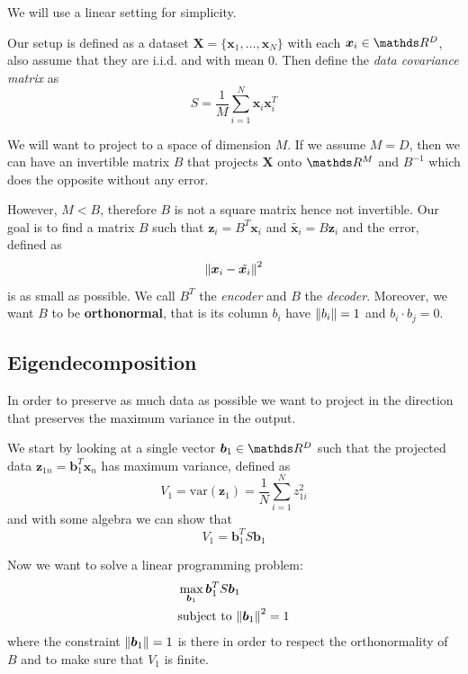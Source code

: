 \documentclass[12pt]{extarticle}
\renewcommand{\vec}[1]{\bm{#1}}
\begin{document}
We will use a linear setting for simplicity.

Our setup is defined as a dataset $\vec X = \{ \vec x_1, \dots, \vec x_N\}$
with each $\vec x_i \in \R^D$, also assume that they are i.i.d. and with mean $0$.
Then define the \emph{data covariance matrix} as
\begin{equation}
	S = \frac{1}{M} \sum_{i = 1}^N \vec x_i \vec x_i^T
\end{equation}

We will want to project to a space of dimension $M$. If we assume $M = D$, then we can have
an invertible matrix $B$ that projects $\bm X$ onto $\R^M$ and $B^{-1}$ which does the opposite
without any error.

However, $M < B$, therefore $B$ is not a square matrix hence not invertible.
Our goal is to find a matrix $B$ such that $\vec z_i = B^T \vec x_i$ and
$\tilde{\vec x_i} = B \vec z_i$ and the error, defined as
\begin{equation}
	\norm{\vec x_i - \tilde{\vec x_i}}^2
\end{equation}
is as small as possible.
We call $B^T$ the \emph{encoder} and $B$ the \emph{decoder}.
Moreover, we want $B$ to be \textbf{orthonormal},
that is its column $b_i$ have $\norm{b_i} = 1$ and $b_i \cdot b_j = 0$.

\subsection{Eigendecomposition}

In order to preserve as much data as possible we want to project in the direction that preserves
the maximum variance in the output.

We start by looking at a single vector $\vec b_1 \in \R^D$ such that the projected data
$\vec z_{1n} = \vec b_1^T \vec x_n$ has maximum variance, defined as
\begin{equation}
	V_1 = \mathrm{var} (\vec z_1) = \frac{1}{N} \sum^N_{i = 1} z_{1i}^2
\end{equation}
and with some algebra we can show that
\begin{equation}
	V_1 = \vec b_1^T S \vec b_1
\end{equation}

Now we want to solve a linear programming problem:
\begin{align}
	 & \max_{\vec b_1} \vec b_1^T S \vec b_1    \\
	 & \text{subject to } \norm{\vec b_1}^2 = 1
\end{align}
where the constraint $\norm{\vec b_1} = 1$ is there in order to respect the orthonormality of $B$
and to make sure that $V_1$ is finite.
\end{document}
